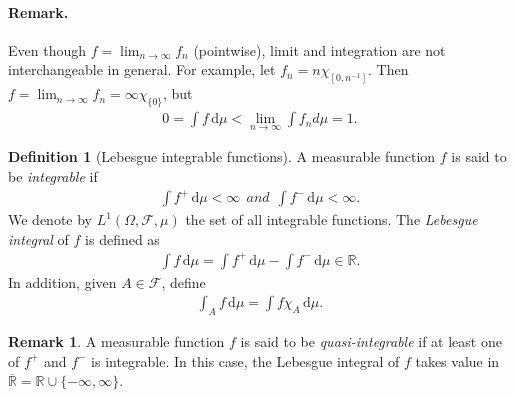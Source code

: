 \documentclass{article}
\numberwithin{equation}{section}
\renewcommand{\d}{\mathrm{d}}
\theoremstyle{plain}
\theoremstyle{definition}
\newtheorem{definition}[theorem]{Definition}
\newtheorem*{remark}{Remark}
\begin{document}
\paragraph{Remark.} Even though $f=\lim_{n\to\infty} f_n$ (pointwise), limit and integration are not interchangeable in general. For example, let $f_n=n\chi_{[0,n^{-1}]}$. Then $f=\lim_{n\to\infty} f_n=\infty\chi_{\{0\}}$, but
\begin{align*}
	0=\int f\,\d \mu < \lim_{n\to\infty}\int f_n d\mu = 1.
\end{align*}

\begin{definition}[Lebesgue integrable functions]\label{def:1.44} A measurable function $f$ is said to be \textit{integrable} if
\begin{align*}
	\int f^+\,\d \mu < \infty\ \ \textit{and}\ \ \int f^-\,\d \mu<\infty.
\end{align*}
We denote by $L^1(\Omega,\mathscr{F},\mu)$ the set of all integrable functions. The \textit{Lebesgue integral} of $f$ is defined as
\begin{align*}
	\int f\,\d \mu = \int f^+\,\d \mu - \int f^-\,\d \mu \in\mathbb{R}.
\end{align*}
In addition, given $A\in\mathscr{F}$, define
\begin{align*}
	\int_A f\,\d \mu = \int f\chi_A\,\d \mu.
\end{align*}
\end{definition}
\begin{remark}
A measurable function $f$ is said to be \textit{quasi-integrable} if at least one of $f^+$ and $f^-$ is integrable. In this case, the Lebesgue integral of $f$ takes value in $\overline{\mathbb{R}}=\mathbb{R}\cup\{-\infty,\infty\}$.
\end{remark}
\end{document}
